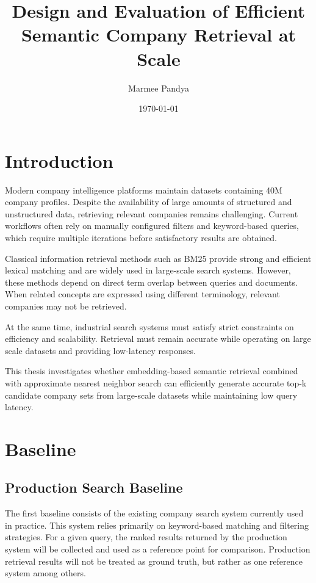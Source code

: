 \documentclass[a4paper]{scrartcl}
\title{Design and Evaluation of Efficient Semantic Company Retrieval at Scale}
\author{Marmee Pandya}
\date{\today}
\begin{document}
\maketitle

\section{Introduction}


Modern company intelligence platforms maintain datasets containing 40M company profiles. Despite the availability of large amounts of structured and unstructured data, retrieving relevant companies remains challenging. Current workflows often rely on manually configured filters and keyword-based queries, which require multiple iterations before satisfactory results are obtained.

Classical information retrieval methods such as BM25 provide strong and efficient lexical matching and are widely used in large-scale search systems. However, these methods depend on direct term overlap between queries and documents. When related concepts are expressed using different terminology, relevant companies may not be retrieved.

At the same time, industrial search systems must satisfy strict constraints on efficiency and scalability. Retrieval must remain accurate while operating on large scale datasets and providing low-latency responses.

This thesis investigates whether embedding-based semantic retrieval combined with approximate nearest neighbor search can efficiently generate accurate top-k candidate company sets from large-scale datasets while maintaining low query latency.

\section{Baseline}

\subsection{Production Search Baseline}


The first baseline consists of the existing company search system currently used in practice. This system relies primarily on keyword-based matching and filtering strategies. For a given query, the ranked results returned by the production system will be collected and used as a reference point for comparison. Production retrieval results will not be treated as ground truth, but rather as one reference system among others.
\end{document}
